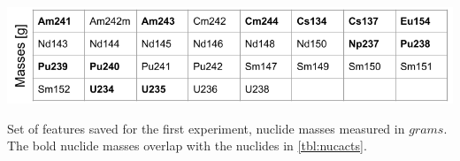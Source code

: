 \begin{table}[!htb]
  \centering
  \includegraphics[width=\linewidth]{./chapters/exp1/nucmass_feats.png}
  \caption{Set of features saved for the first experiment, nuclide masses 
           measured in $grams$. The bold nuclide masses overlap with the 
           nuclides in \ref{tbl:nucacts}.}
  \label{tbl:nucmass}
\end{table}

